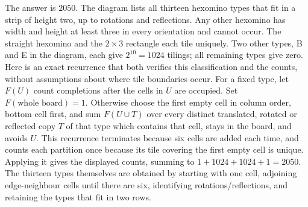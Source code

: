 The answer is $\boxed{2050}$. The diagram lists all thirteen hexomino types that fit in a strip of height two, up to rotations and reflections. Any other hexomino has width and height at least three in every orientation and cannot occur. The straight hexomino and the $2\times3$ rectangle each tile uniquely. Two other types, B and E in the diagram, each give $2^{10}=1024$ tilings; all remaining types give zero. Here is an exact recurrence that both verifies this classification and the counts, without assumptions about where tile boundaries occur. For a fixed type, let $F(U)$ count completions after the cells in $U$ are occupied. Set $F(\text{whole board})=1$. Otherwise choose the first empty cell in column order, bottom cell first, and sum $F(U\cup T)$ over every distinct translated, rotated or reflected copy $T$ of that type which contains that cell, stays in the board, and avoids $U$. This recurrence terminates because six cells are added each time, and counts each partition once because its tile covering the first empty cell is unique. Applying it gives the displayed counts, summing to $1+1024+1024+1=2050$. The thirteen types themselves are obtained by starting with one cell, adjoining edge-neighbour cells until there are six, identifying rotations/reflections, and retaining the types that fit in two rows.
